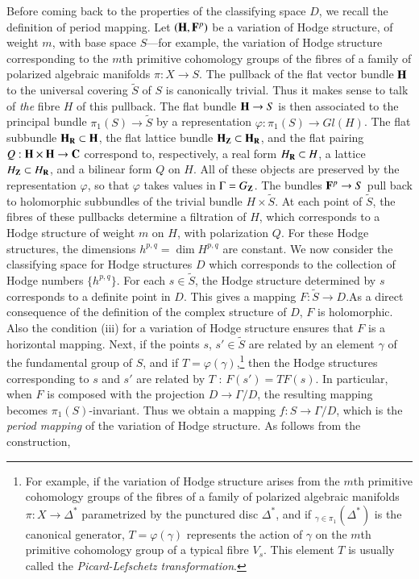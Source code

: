 Before coming back to the properties of the classifying space $D$, we recall the definition of period mapping. Let $(\mathbf{H}, \mathbf{F}^p)$ be a variation of Hodge structure, of weight $m$, with base space $S$---for example, the variation of Hodge structure corresponding to the $m$th primitive cohomology groups of the fibres of a family of polarized algebraic manifolds $\pi: X \to S$. The pullback of the flat vector bundle $\mathbf{H}$ to the universal covering $\tilde{S}$ of $S$ is canonically trivial. Thus it makes sense  to talk of \textit{the} fibre $H$ of this pullback. The flat bundle $\mathbf{H}  \to S$ is then associated to the principal bundle $\pi_1 (S) \to \tilde{S}$ by a representation $\varphi: \pi_1 (S) \to Gl (H)$. The flat subbundle $\mathbf{H}_{\mathbf{R}} \subset \mathbf{H}$, the flat lattice bundle $\mathbf{H}_{\mathbf{Z}} \subset \mathbf{H}_{\mathbf{R}}$, and the flat pairing $Q : \mathbf{H} \times \mathbf{H} \to \mathbf{C}$ correspond to, respectively, a real form $H_{\mathbf{R}} \subset H$, a lattice $H_{\mathbf{Z}} \subset H_{\mathbf{R}}$, and a bilinear form $Q$ on $H$. All of these objects are preserved by the representation $\varphi$, so that $\varphi$ takes values in $\Gamma = G_{\mathbf{Z}}$. The bundles $\mathbf{F}^p \to S$ pull back to holomorphic subbundles of the trivial bundle $H \times \tilde{S}$. At each point of $\tilde{S}$, the fibres of these pullbacks determine a filtration of $H$, which corresponds to a Hodge structure of weight $m$ on $H$, with polarization $Q$. For these Hodge structures, the dimensions $h^{p,q} = \dim H^{p,q}$ are constant. We now consider the classifying space for Hodge structures $D$ which corresponds to the collection of Hodge numbers $\{h^{p,q}\}$. For each $s \in  \tilde{S}$, the Hodge structure determined by $s$ corresponds to a definite point in $D$. This gives a mapping $F: \tilde{S} \to D$.\pageoriginale As a direct consequence of the definition of the complex structure of $D$, $F$ is holomorphic. Also the condition (iii) for a variation of Hodge structure ensures that $F$ is a horizontal mapping. Next, if the points $s$, $s' \in \tilde{S}$ are related by an element $\gamma$ of the fundamental group of $S$, and if $T = \varphi(\gamma)$,\footnote[8]{For example, if the variation of Hodge structure arises from the $m$th primitive cohomology groups of the fibres of a family of polarized algebraic manifolds $\pi: X \to \Delta^\ast$ parametrized by the punctured disc $\Delta^\ast$, and if ${}_{\gamma \in \pi_1} (\Delta^\ast)$ is the canonical generator, $T = \varphi (\gamma)$  represents the action of $\gamma$ on the $m$th primitive cohomology group of a typical fibre $V_s$. This element $T$ is usually called the \textit{Picard-Lefschetz transformation}.} then the Hodge  structures corresponding to $s$ and $s'$ are related by $T$ : \ie $F(s') = T F (s)$. In particular, when $F$ is composed with the projection $D \to \Gamma / D$, the resulting mapping becomes $\pi_1 (S)$-invariant. Thus we obtain a mapping $f: S \to \Gamma/ D$, which is the \textit{period mapping} of the variation of Hodge structure. As follows from the construction,
